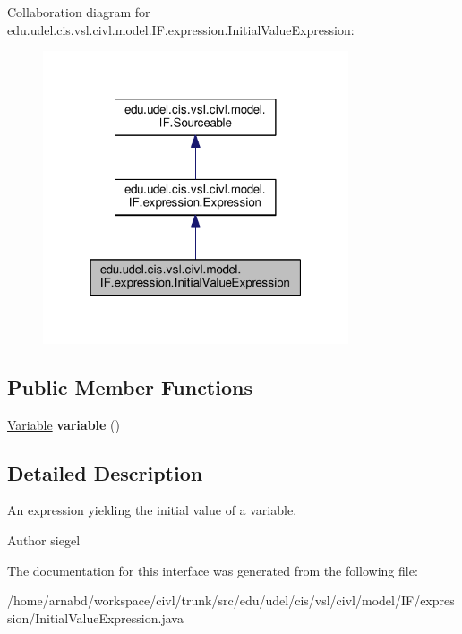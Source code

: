 Collaboration diagram for edu.\+udel.\+cis.\+vsl.\+civl.\+model.\+I\+F.\+expression.\+Initial\+Value\+Expression\+:
\nopagebreak
\begin{figure}[H]
\begin{center}
\leavevmode
\includegraphics[width=256pt]{interfaceedu_1_1udel_1_1cis_1_1vsl_1_1civl_1_1model_1_1IF_1_1expression_1_1InitialValueExpression__coll__graph}
\end{center}
\end{figure}
\subsection*{Public Member Functions}
\begin{DoxyCompactItemize}
\item 
\hypertarget{interfaceedu_1_1udel_1_1cis_1_1vsl_1_1civl_1_1model_1_1IF_1_1expression_1_1InitialValueExpression_aaf2ef0e71943118f9af2f63ad49fc305}{}\hyperlink{interfaceedu_1_1udel_1_1cis_1_1vsl_1_1civl_1_1model_1_1IF_1_1variable_1_1Variable}{Variable} {\bfseries variable} ()\label{interfaceedu_1_1udel_1_1cis_1_1vsl_1_1civl_1_1model_1_1IF_1_1expression_1_1InitialValueExpression_aaf2ef0e71943118f9af2f63ad49fc305}

\end{DoxyCompactItemize}


\subsection{Detailed Description}
An expression yielding the initial value of a variable. 

\begin{DoxyAuthor}{Author}
siegel 
\end{DoxyAuthor}


The documentation for this interface was generated from the following file\+:\begin{DoxyCompactItemize}
\item 
/home/arnabd/workspace/civl/trunk/src/edu/udel/cis/vsl/civl/model/\+I\+F/expression/Initial\+Value\+Expression.\+java\end{DoxyCompactItemize}
